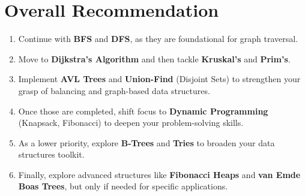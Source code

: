 \documentclass{article}
\begin{document}
\section{Overall Recommendation}
\begin{enumerate}[label=\arabic*.]
    \item Continue with \textbf{BFS} and \textbf{DFS}, as they are foundational for graph traversal.
    \item Move to \textbf{Dijkstra’s Algorithm} and then tackle \textbf{Kruskal’s} and \textbf{Prim’s}.
    \item Implement \textbf{AVL Trees} and \textbf{Union-Find} (Disjoint Sets) to strengthen your grasp of balancing and graph-based data structures.
    \item Once those are completed, shift focus to \textbf{Dynamic Programming} (Knapsack, Fibonacci) to deepen your problem-solving skills.
    \item As a lower priority, explore \textbf{B-Trees} and \textbf{Tries} to broaden your data structures toolkit.
    \item Finally, explore advanced structures like \textbf{Fibonacci Heaps} and \textbf{van Emde Boas Trees}, but only if needed for specific applications.
\end{enumerate}
\end{document}
